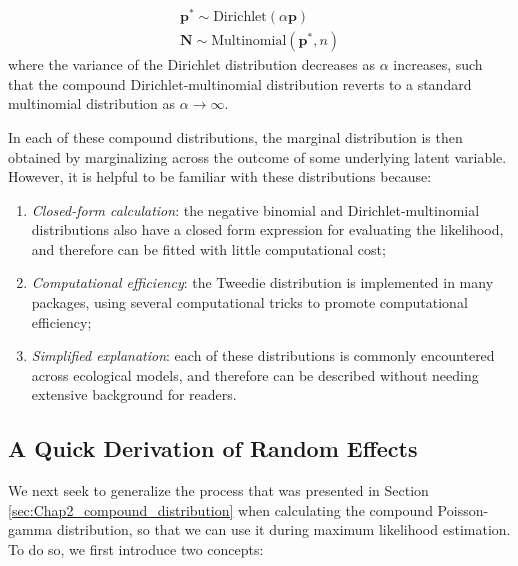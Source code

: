 \begin{itemize}
\begin{equation} \label{eq:Chap2_Dirichlet-multinomial}
\begin{gathered}
    \mathbf{p}^* \sim \mathrm{Dirichlet}( \alpha \mathbf{p} ) \\ 
    \mathbf{N} \sim \mathrm{Multinomial}( \mathbf{p}^*, n ) 
\end{gathered}
\end{equation}
    where the variance of the Dirichlet distribution decreases as \( \alpha \) increases, such that the compound Dirichlet-multinomial distribution reverts to a standard multinomial distribution as \( \alpha \rightarrow \infty \).  
    
\end{itemize}

In each of these compound distributions, the marginal distribution is then obtained by marginalizing across the outcome of some underlying latent variable.  However, it is helpful to be familiar with these distributions because:

\begin{enumerate}
    \item \textit{Closed-form calculation}: the negative binomial and Dirichlet-multinomial distributions also have a closed form expression for evaluating the likelihood, and therefore can be fitted with little computational cost;
    
    \item \textit{Computational efficiency}: the Tweedie distribution is implemented in many packages, using several computational tricks to promote computational efficiency;
    
    \item \textit{Simplified explanation}: each of these distributions is commonly encountered across ecological models, and therefore can be described without needing extensive background for readers.  
\end{enumerate}

\subsection{A Quick Derivation of Random Effects} \label{sec:Chap2_deriving_random_effects}

We next seek to generalize the process that was presented in Section \ref{sec:Chap2_compound_distribution} when calculating the compound Poisson-gamma distribution, so that we can use it during maximum likelihood estimation.  To do so, we first introduce two concepts:

